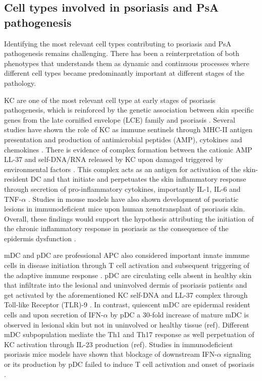 \subsection{Cell types involved in psoriasis and PsA pathogenesis}

Identifying the most relevant cell types contributing to psoriasis and PsA pathogenesis remains challenging. There has been a reinterpretation of both phenotypes that understands them as dynamic and continuous processes where different cell types became predominantly important at different stages of the pathology. 

KC are one of the most relevant cell type at early stages of psoriasis pathogenesis, which is reinforced by the genetic association between skin specific genes from the late cornified envelope (LCE) family and psoriasis \parencite{Tsoi2012}. Several studies have shown the role of KC as immune sentinels through MHC-II antigen presentation and production of antimicrobial peptides (AMP), cytokines and chemokines \parencite{Black2007}. There is evidence of complex formation between the cationic AMP LL-37 and self-DNA/RNA released by KC upon damaged triggered by environmental factors \parencite{Lande2007}. This complex acts as an antigen for activation of the skin-resident DC \parencite{Nestle2005} and that initiate and perpetuates the skin inflammatory response through secretion of pro-inflammatory cytokines, importantly IL-1, IL-6 and TNF-$\alpha$ \parencite{Feldmeyer2007, Arend2008, Nestle2009}. Studies in mouse models have also shown development of psoriatic lesions in immunodeficient mice upon human xenotransplant of psoriasis skin\parencite{Boyman2004}. Overall, these findings would support the hypothesis attributing the initiation of the chronic inflammatory response in psoriasis as the consequence of the epidermis dysfunction . 

mDC and pDC are professional APC also considered important innate immune cells in disease initiation through T cell activation and subsequent triggering of the adaptive immune response \parencite{Mahil20016}. %
pDC are circulating cells absent in healthy skin that infiltrate into the lesional and uninvolved dermis of psoriasis patients and get activated by the aforementioned KC self-DNA and LL-37 complex through Toll-like Receptor (TLR)-9 \parencite{Nestle2005, Lande2007}. In contrast, quiescent mDC are epidermal resident cells and upon secretion of IFN-$\alpha$ by pDC a 30-fold increase of mature mDC is observed in lesional skin but not in uninvolved or healthy tissue (ref). Different mDC subpopulation mediate the Th1 and Th17 response as well perpetuation of KC activation through IL-23 production (ref). Studies in immunodeficient psoriasis mice models have shown that blockage of downstream  IFN-$\alpha$ signaling or its production by pDC failed to induce T cell activation and onset of psoriasis \parencite{Nestle2005}. 

